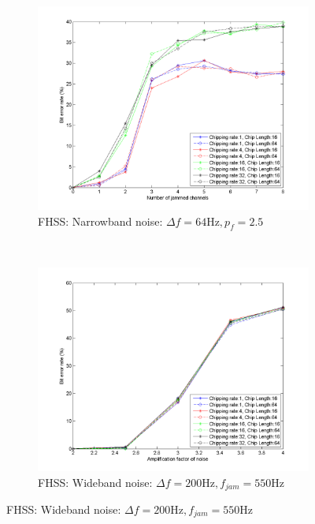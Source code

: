 			\begin{figure}[H]
				\centering
				\caption{}
				\begin{subfigure}[b]{0.5\textwidth}
					\includegraphics[width=\textwidth]{imgs/results/plot_mode_fhss-test_narrowband-rep_20-dataRate_8-dataLength_128.png}
					\caption{FHSS: Narrowband noise: $\Delta f= 64 \text{Hz}, p_f = 2.5$}
					\label{fig:fhss_narrowband}
				\end{subfigure}%
				~
				\begin{subfigure}[b]{0.5\textwidth}
					\includegraphics[width=\textwidth]{imgs/results/plot_mode_fhss-test_wideband-rep_20-dataRate_8-dataLength_128.png}
					\caption{FHSS: Wideband noise: $\Delta f= 200 \text{Hz}, f_{jam} = 550\text{Hz}$}
					\label{fig:fhss_wideband}
				\end{subfigure}
			\end{figure}
			
